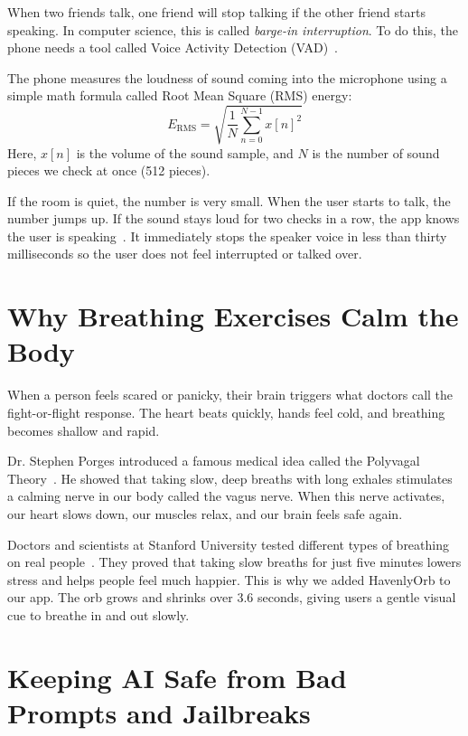 When two friends talk, one friend will stop talking if the other friend starts speaking. In computer science, this is called \textit{barge-in interruption}. To do this, the phone needs a tool called Voice Activity Detection (VAD)~\cite{rabiner2010speech}.

The phone measures the loudness of sound coming into the microphone using a simple math formula called Root Mean Square (RMS) energy:
\begin{equation}
\label{eq:simple_rms}
E_{\text{RMS}} = \sqrt{\frac{1}{N} \sum_{n=0}^{N-1} x[n]^2}
\end{equation}
Here, $x[n]$ is the volume of the sound sample, and $N$ is the number of sound pieces we check at once (512 pieces). 

If the room is quiet, the number is very small. When the user starts to talk, the number jumps up. If the sound stays loud for two checks in a row, the app knows the user is speaking~\cite{johnston2018vad}. It immediately stops the speaker voice in less than thirty milliseconds so the user does not feel interrupted or talked over.

\section{Why Breathing Exercises Calm the Body}
\label{sec:lit_psychometrics}

When a person feels scared or panicky, their brain triggers what doctors call the fight-or-flight response. The heart beats quickly, hands feel cold, and breathing becomes shallow and rapid.

Dr. Stephen Porges introduced a famous medical idea called the Polyvagal Theory~\cite{porges2011polyvagal}. He showed that taking slow, deep breaths with long exhales stimulates a calming nerve in our body called the vagus nerve. When this nerve activates, our heart slows down, our muscles relax, and our brain feels safe again.

Doctors and scientists at Stanford University tested different types of breathing on real people~\cite{balban2023respiration}. They proved that taking slow breaths for just five minutes lowers stress and helps people feel much happier. This is why we added HavenlyOrb to our app. The orb grows and shrinks over 3.6 seconds, giving users a gentle visual cue to breathe in and out slowly.

\section{Keeping AI Safe from Bad Prompts and Jailbreaks}
\label{sec:lit_safety}

